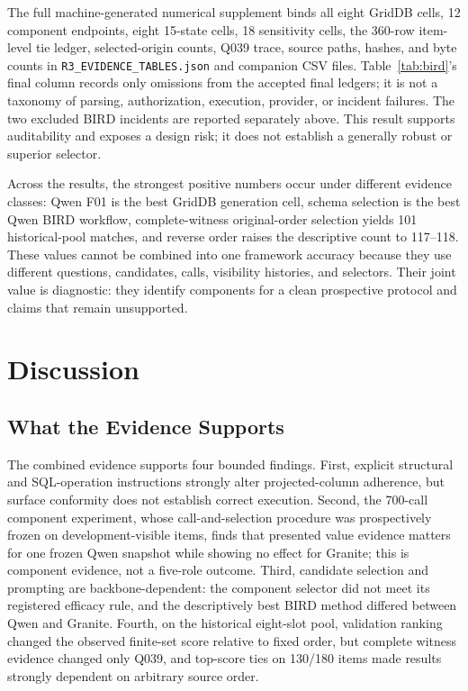 \documentclass[applsci,article,submit,moreauthors]{Definitions/mdpi}
\begin{document}
The full machine-generated numerical supplement binds all eight GridDB cells, 12 component endpoints, eight 15-state cells, 18 sensitivity cells, the 360-row item-level tie ledger, selected-origin counts, Q039 trace, source paths, hashes, and byte counts in \texttt{R3\_EVIDENCE\_TABLES.json} and companion CSV files. Table~\ref{tab:bird}'s final column records only omissions from the accepted final ledgers; it is not a taxonomy of parsing, authorization, execution, provider, or incident failures. The two excluded BIRD incidents are reported separately above. This result supports auditability and exposes a design risk; it does not establish a generally robust or superior selector.

Across the results, the strongest positive numbers occur under different evidence classes: Qwen F01 is the best GridDB generation cell, schema selection is the best Qwen BIRD workflow, complete-witness original-order selection yields 101 historical-pool matches, and reverse order raises the descriptive count to 117--118. These values cannot be combined into one framework accuracy because they use different questions, candidates, calls, visibility histories, and selectors. Their joint value is diagnostic: they identify components for a clean prospective protocol and claims that remain unsupported.

\section{Discussion}

\subsection{What the Evidence Supports}

The combined evidence supports four bounded findings. First, explicit structural and SQL-operation instructions strongly alter projected-column adherence, but surface conformity does not establish correct execution. Second, the 700-call component experiment, whose call-and-selection procedure was prospectively frozen on development-visible items, finds that presented value evidence matters for one frozen Qwen snapshot while showing no effect for Granite; this is component evidence, not a five-role outcome. Third, candidate selection and prompting are backbone-dependent: the component selector did not meet its registered efficacy rule, and the descriptively best BIRD method differed between Qwen and Granite. Fourth, on the historical eight-slot pool, validation ranking changed the observed finite-set score relative to fixed order, but complete witness evidence changed only Q039, and top-score ties on 130/180 items made results strongly dependent on arbitrary source order.
\end{document}
